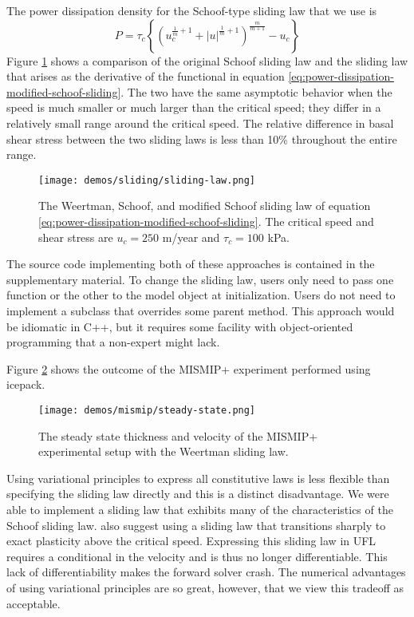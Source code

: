 \documentclass{article}
\theoremstyle{definition}
\theoremstyle{plain}
\begin{document}
The power dissipation density for the Schoof-type sliding law that we use is
\begin{equation}
    P = \tau_c\left\{\left(u_c^{\frac{1}{m} + 1} + |u|^{\frac{1}{m} + 1}\right)^{\frac{m}{m + 1}} - u_c\right\}
    \label{eq:power-dissipation-modified-schoof-sliding}
\end{equation}
Figure \ref{fig:sliding-laws} shows a comparison of the original Schoof sliding law and the sliding law that arises as the derivative of the functional in equation \eqref{eq:power-dissipation-modified-schoof-sliding}.
The two have the same asymptotic behavior when the speed is much smaller or much larger than the critical speed; they differ in a relatively small range around the critical speed.
The relative difference in basal shear stress between the two sliding laws is less than 10\% throughout the entire range.

\begin{figure}[h]
    \texttt{[image: demos/sliding/sliding-law.png]}
    \caption{The Weertman, Schoof, and modified Schoof sliding law of equation \eqref{eq:power-dissipation-modified-schoof-sliding}.
    The critical speed and shear stress are $u_c = 250$ m/year and $\tau_c = 100$ kPa.}
    \label{fig:sliding-laws}
\end{figure}

The source code implementing both of these approaches is contained in the supplementary material.
To change the sliding law, users only need to pass one function or the other to the model object at initialization.
Users do not need to implement a subclass that overrides some parent method.
This approach would be idiomatic in C++, but it requires some facility with object-oriented programming that a non-expert might lack.

Figure \ref{fig:mismip} shows the outcome of the MISMIP+ experiment performed using icepack.

\begin{figure}[h]
    \texttt{[image: demos/mismip/steady-state.png]}
    \caption{The steady state thickness and velocity of the MISMIP+ experimental setup with the Weertman sliding law.}
    \label{fig:mismip}
\end{figure}

Using variational principles to express all constitutive laws is less flexible than specifying the sliding law directly and this is a distinct disadvantage.
We were able to implement a sliding law that exhibits many of the characteristics of the Schoof sliding law.
\citet{asay2016experimental} also suggest using a sliding law that transitions sharply to exact plasticity above the critical speed.
Expressing this sliding law in UFL requires a conditional in the velocity and is thus no longer differentiable.
This lack of differentiability makes the forward solver crash.
The numerical advantages of using variational principles are so great, however, that we view this tradeoff as acceptable.
\end{document}
